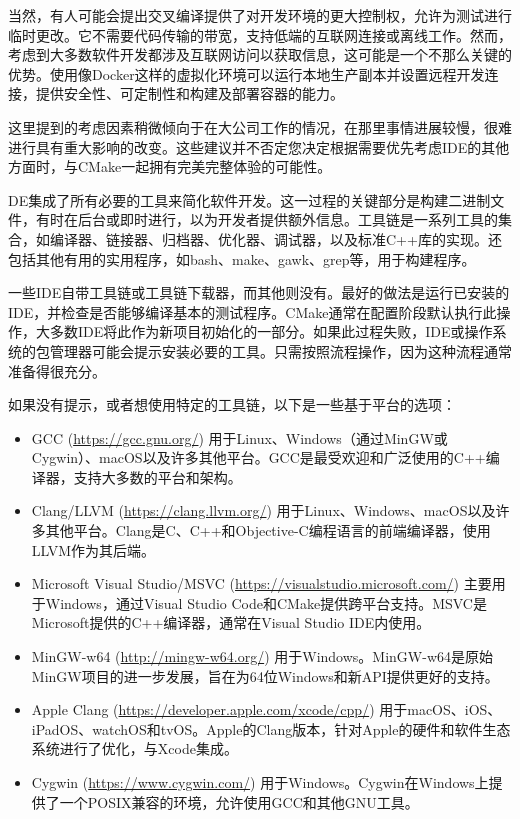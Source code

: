 当然，有人可能会提出交叉编译提供了对开发环境的更大控制权，允许为测试进行临时更改。它不需要代码传输的带宽，支持低端的互联网连接或离线工作。然而，考虑到大多数软件开发都涉及互联网访问以获取信息，这可能是一个不那么关键的优势。使用像Docker这样的虚拟化环境可以运行本地生产副本并设置远程开发连接，提供安全性、可定制性和构建及部署容器的能力。

这里提到的考虑因素稍微倾向于在大公司工作的情况，在那里事情进展较慢，很难进行具有重大影响的改变。这些建议并不否定您决定根据需要优先考虑IDE的其他方面时，与CMake一起拥有完美完整体验的可能性。


DE集成了所有必要的工具来简化软件开发。这一过程的关键部分是构建二进制文件，有时在后台或即时进行，以为开发者提供额外信息。工具链是一系列工具的集合，如编译器、链接器、归档器、优化器、调试器，以及标准C++库的实现。还包括其他有用的实用程序，如bash、make、gawk、grep等，用于构建程序。

一些IDE自带工具链或工具链下载器，而其他则没有。最好的做法是运行已安装的IDE，并检查是否能够编译基本的测试程序。CMake通常在配置阶段默认执行此操作，大多数IDE将此作为新项目初始化的一部分。如果此过程失败，IDE或操作系统的包管理器可能会提示安装必要的工具。只需按照流程操作，因为这种流程通常准备得很充分。

如果没有提示，或者想使用特定的工具链，以下是一些基于平台的选项：

\begin{itemize}
\item
GCC (\url{https://gcc.gnu.org/}) 用于Linux、Windows（通过MinGW或Cygwin）、macOS以及许多其他平台。GCC是最受欢迎和广泛使用的C++编译器，支持大多数的平台和架构。

\item
Clang/LLVM (\url{https://clang.llvm.org/}) 用于Linux、Windows、macOS以及许多其他平台。Clang是C、C++和Objective-C编程语言的前端编译器，使用LLVM作为其后端。

\item
Microsoft Visual Studio/MSVC (\url{https://visualstudio.microsoft.com/}) 主要用于Windows，通过Visual Studio Code和CMake提供跨平台支持。MSVC是Microsoft提供的C++编译器，通常在Visual Studio IDE内使用。

\item
MinGW-w64 (\url{http://mingw-w64.org/}) 用于Windows。MinGW-w64是原始MinGW项目的进一步发展，旨在为64位Windows和新API提供更好的支持。

\item
Apple Clang (\url{https://developer.apple.com/xcode/cpp/}) 用于macOS、iOS、iPadOS、watchOS和tvOS。Apple的Clang版本，针对Apple的硬件和软件生态系统进行了优化，与Xcode集成。

\item
Cygwin (\url{https://www.cygwin.com/}) 用于Windows。Cygwin在Windows上提供了一个POSIX兼容的环境，允许使用GCC和其他GNU工具。
\end{itemize}

